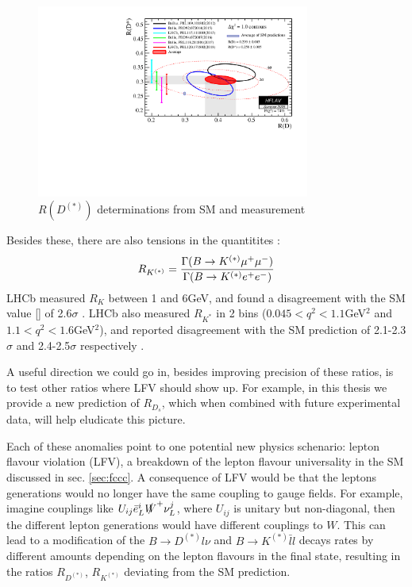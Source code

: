 \begin{figure}
  \begin{center}
    \includegraphics[width=
   0.8\textwidth]{images/rdrds_summer18.pdf}
  \end{center}
  \caption{$R(D^{(*)})$ determinations from SM and measurement
    \cite{HFLAV16}
  \label{fig:ratiotension}}
\end{figure}

Besides these, there are also tensions in the quantitites \cite{Altmannshofer:2017yso}:
\begin{align}
	R_{K^{(*)}} = {\Gamma( B\to K^{(*)}\mu^+\mu^-)\over \Gamma( B\to K^{(*)} e^+e^-)}
\end{align}
LHCb measured $R_K$ between 1 and 6GeV, and found a disagreement with the SM value [{}] of 2.6$\sigma$ \cite{Aaij:2014ora}. LHCb also measured $R_{K^*}$ in 2 bins ($0.045<q^2<1.1 $GeV$^2$ and $1.1<q^2<1.6$GeV$^2$), and reported disagreement with the SM prediction \cite{Bordone:2016gaq,Descotes-Genon:2015uva,Capdevila:2016ivx,Capdevila:2017ert,Serra:2016ivr,Straub:2015ica,Altmannshofer:2017fio,Jager:2014rwa} of 2.1-2.3$\sigma$ and 2.4-2.5$\sigma$ respectively \cite{Aaij:2017vbb}. 

A useful direction we could go in, besides improving precision of these ratios, is to test other ratios where LFV should show up. For example, in this thesis we provide a new prediction of $R_{D_s}$, which when combined with future experimental data, will help eludicate this picture.

Each of these anomalies point to one potential new physics schenario: lepton flavour violation (LFV), a breakdown of the lepton flavour universality in the SM discussed in sec. \ref{sec:fccc}. A consequence of LFV would be that the leptons generations would no longer have the same coupling to gauge fields. For example, imagine couplings like $U_{ij} \bar{e}_L^i \slashed{W}^+ \nu_L^j$, where $U_{ij}$ is unitary but non-diagonal, then the different lepton generations would have different couplings to $W$. This can lead to a modification of the $B\to D^{(*)}l\nu$ and $B\to K^{(*)}\bar{l}l$ decays rates by different amounts depending on the lepton flavours in the final state, resulting in the ratios $R_{D^{(*)}}$, $R_{K^{(*)}}$ deviating from the SM prediction. 

